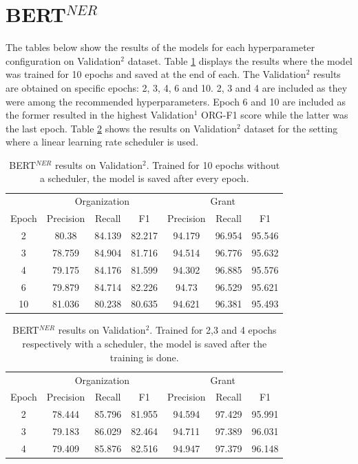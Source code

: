 \documentclass{report}
\theoremstyle{definition}
\theoremstyle{remark}
\begin{document}
\section{BERT$^{NER}$}
\label{sec:app:bertner}
The tables below show the results of the models for each hyperparameter configuration on Validation$^2$ dataset. Table \ref{tab:bert_ner_no_scheduler} displays the results where the model was trained for 10 epochs and saved at the end of each. The Validation$^2$ results are obtained on specific epochs: 2, 3, 4, 6 and 10. 2, 3 and 4 are included as they were among the recommended hyperparameters. Epoch 6 and 10 are included as the former resulted in the highest Validation$^1$ ORG-F1 score while the latter was the last epoch. Table \ref{tab:bert_ner_scheduler} shows the results on Validation$^2$ dataset for the setting where a linear learning rate scheduler is used.

\begin{table}[h!]
    \centering
    \begin{tabular}{c| c c c| c c c}
    &\multicolumn{3}{c|}{Organization}&\multicolumn{3}{c}{Grant} \\
    Epoch&Precision&Recall&F1&Precision&Recall&F1\\
    \hline
    2     & 80.38	&84.139&82.217	&94.179&	96.954&95.546  \\
    3     & 78.759	&84.904&81.716	&94.514&	96.776&95.632  \\
    4     & 79.175	&84.176&81.599	&94.302&	96.885&95.576  \\
    6     & 79.879	&84.714&82.226	&94.73	&96.529&95.621  \\
    10   &  81.036	&80.238&80.635	&94.621&	96.381&95.493  \\
    \end{tabular}
    \caption{BERT$^{NER}$ results on Validation$^2$. Trained for 10 epochs without a scheduler, the model is saved after every epoch.}
    \label{tab:bert_ner_no_scheduler}
\end{table}


\begin{table}[h!]
    \centering
    \begin{tabular}{c| c c c| c c c}
    &\multicolumn{3}{c|}{Organization}&\multicolumn{3}{c}{Grant} \\
    Epoch&Precision&Recall&F1&Precision&Recall&F1\\
    \hline
    2     & 78.444&	85.796&	81.955&	94.594&	97.429&	95.991
 \\
    3     & 79.183&86.029&82.464&94.711&97.389&96.031
 \\
    4     & 79.409&85.876&82.516&94.947&97.379&96.148
 \\
    \end{tabular}
    \caption{BERT$^{NER}$ results on Validation$^2$. Trained for 2,3 and 4 epochs respectively with a scheduler, the model is saved after the training is done.}
    \label{tab:bert_ner_scheduler}
\end{table}
\end{document}
